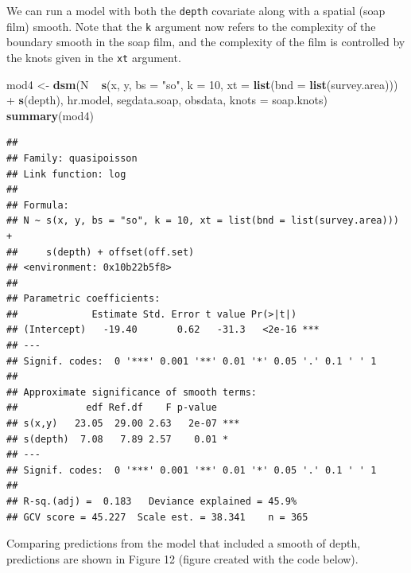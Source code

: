 \documentclass[]{article}
\newenvironment{Shaded}{}{}
\newcommand{\KeywordTok}[1]{\textcolor[rgb]{0.00,0.44,0.13}{\textbf{{#1}}}}
\newcommand{\DataTypeTok}[1]{\textcolor[rgb]{0.56,0.13,0.00}{{#1}}}
\newcommand{\DecValTok}[1]{\textcolor[rgb]{0.25,0.63,0.44}{{#1}}}
\newcommand{\StringTok}[1]{\textcolor[rgb]{0.25,0.44,0.63}{{#1}}}
\newcommand{\NormalTok}[1]{{#1}}
\begin{document}
We can run a model with both the \texttt{depth} covariate along with a
spatial (soap film) smooth. Note that the \texttt{k} argument now refers
to the complexity of the boundary smooth in the soap film, and the
complexity of the film is controlled by the knots given in the
\texttt{xt} argument.

\begin{Shaded}
\begin{Highlighting}[]
\NormalTok{mod4 <-}\StringTok{ }\KeywordTok{dsm}\NormalTok{(N ~}\StringTok{ }\KeywordTok{s}\NormalTok{(x, y, }\DataTypeTok{bs =} \StringTok{"so"}\NormalTok{, }\DataTypeTok{k =} \DecValTok{10}\NormalTok{, }\DataTypeTok{xt =} \KeywordTok{list}\NormalTok{(}\DataTypeTok{bnd =} \KeywordTok{list}\NormalTok{(survey.area))) +}\StringTok{ }
\StringTok{    }\KeywordTok{s}\NormalTok{(depth), hr.model, segdata.soap, obsdata, }\DataTypeTok{knots =} \NormalTok{soap.knots)}
\KeywordTok{summary}\NormalTok{(mod4)}
\end{Highlighting}
\end{Shaded}

\begin{verbatim}
## 
## Family: quasipoisson 
## Link function: log 
## 
## Formula:
## N ~ s(x, y, bs = "so", k = 10, xt = list(bnd = list(survey.area))) + 
##     s(depth) + offset(off.set)
## <environment: 0x10b22b5f8>
## 
## Parametric coefficients:
##             Estimate Std. Error t value Pr(>|t|)    
## (Intercept)   -19.40       0.62   -31.3   <2e-16 ***
## ---
## Signif. codes:  0 '***' 0.001 '**' 0.01 '*' 0.05 '.' 0.1 ' ' 1
## 
## Approximate significance of smooth terms:
##            edf Ref.df    F p-value    
## s(x,y)   23.05  29.00 2.63   2e-07 ***
## s(depth)  7.08   7.89 2.57    0.01 *  
## ---
## Signif. codes:  0 '***' 0.001 '**' 0.01 '*' 0.05 '.' 0.1 ' ' 1
## 
## R-sq.(adj) =  0.183   Deviance explained = 45.9%
## GCV score = 45.227  Scale est. = 38.341    n = 365
\end{verbatim}

Comparing predictions from the model that included a smooth of depth,
predictions are shown in Figure 12 (figure created with the code below).
\end{document}
